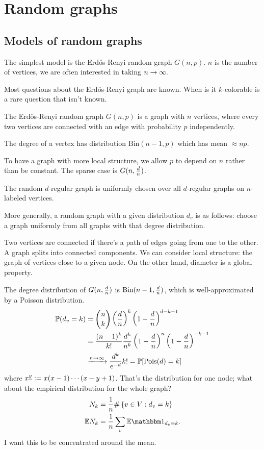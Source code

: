 \chapter{Random graphs}

\section{Models of random graphs}

The simplest model is the Erd\H os-Renyi random graph $G(n,p)$. $n$ is the number of vertices, we are often interested in taking $n\to \infty$.

Most questions about the Erd\H os-Renyi graph are known. When is it $k$-colorable is a rare question that isn't known.

\begin{df}
The Erd\H os-Renyi random graph $G(n,p)$ is a graph with $n$ vertices, where every two vertices are connected with an edge with probability $p$ independently.
\end{df}
The degree of a vertex has distribution $\text{Bin}(n-1,p)$ which has mean $\approx np$.

To have a graph with more local structure, we allow $p$ to depend on $n$ rather than be constant. The sparse case is $G(n,\frac{d}{n})$.

\begin{df}
The random $d$-regular graph is uniformly chosen over all $d$-regular graphs on $n$-labeled vertices.
\end{df}
More generally, a random graph with a given distribution $d_v$ is as follows: %
choose a graph uniformly from all graphs with that degree distribution. 

Two vertices are connected if there's a path of edges going from one to the other. 
A graph splits into connected components. 
We can consider local structure: the graph of vertices close to a given node.
On the other hand, diameter is a global property.

The degree distribution of $G(n,\frac{d}{n})$ is $\text{Bin}(n-1,\frac{d}{n})$, which is well-approximated by a Poisson distribution.
\begin{align}
\mathbb{P}(d_v=k) &= \binom nk \left( {\frac{d}{n}} \right)^k \left( {1-\frac{d}{n}} \right)^{d-k-1}\\
&= \frac{(n-1)^{\underline{k}}}{k!} \frac{d^k}{n^k} \left( {1-\frac{d}{n}} \right)^n \left( {1-\frac{d}{n}} \right)^{-k-1}\\
&\xrightarrow{n\to \infty} \frac{d^k}{e^{-d}}{k!} = \mathbb{P}[\text{Pois}(d)=k]
\end{align}
where $x^{\underline{y}}:= x(x-1)\cdots (x-y+1)$.
That's the distribution for one node; what about the empirical distribution for the whole graph?
%
\begin{align}
N_k &= \rc{n}\#\set{v\in V}{d_v=k}\\  
\E N_k &= \rc n \sum_v \E \one_{d_v=k}.
\end{align}
I want this to be concentrated around the mean.

